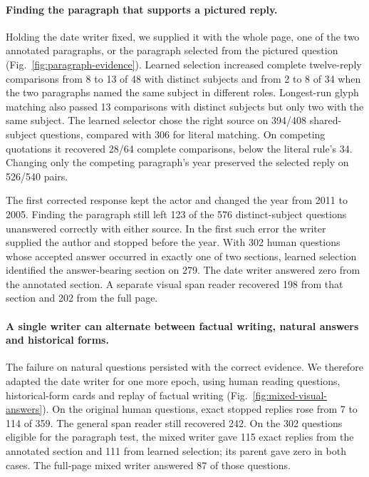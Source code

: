 \documentclass[12pt,a4paper]{article}
\providecommand{\DIFadd}[1]{{\protect\color{blue} \sf #1}} %
\begin{document}
\paragraph{\DIFadd{Finding the paragraph that supports a pictured reply.}}
\DIFadd{Holding the date writer fixed, we supplied it with the whole page, one of the two annotated paragraphs, or the paragraph selected from the pictured question (Fig.~\ref{fig:paragraph-evidence}). Learned selection increased complete twelve-reply comparisons from 8 to 13 of 48 with distinct subjects and from 2 to 8 of 34 when the two paragraphs named the same subject in different roles. Longest-run glyph matching also passed 13 comparisons with distinct subjects but only two with the same subject. The learned selector chose the right source on 394/408 shared-subject questions, compared with 306 for literal matching. On competing quotations it recovered 28/64 complete comparisons, below the literal rule's 34. Changing only the competing paragraph's year preserved the selected reply on 526/540 pairs.
}

\DIFadd{The first corrected response kept the actor and changed the year from 2011 to 2005. Finding the paragraph still left 123 of the 576 distinct-subject questions unanswered correctly with either source. In the first such error the writer supplied the author and stopped before the year. With 302 human questions whose accepted answer occurred in exactly one of two sections, learned selection identified the answer-bearing section on 279. The date writer answered zero from the annotated section. A separate visual span reader recovered 198 from that section and 202 from the full page.
}

\paragraph{\DIFadd{A single writer can alternate between factual writing, natural answers and historical forms.}}
\DIFadd{The failure on natural questions persisted with the correct evidence. We therefore adapted the date writer for one more epoch, using human reading questions, historical-form cards and replay of factual writing (Fig.~\ref{fig:mixed-visual-answers}). On the original human questions, exact stopped replies rose from 7 to 114 of 359. The general span reader still recovered 242. On the 302 questions eligible for the paragraph test, the mixed writer gave 115 exact replies from the annotated section and 111 from learned selection; its parent gave zero in both cases. The full-page mixed writer answered 87 of those questions.
}
\end{document}
